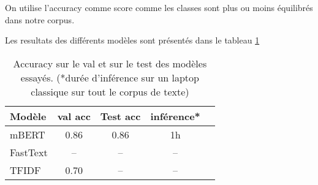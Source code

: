 
On utilise l'accuracy comme score comme les classes sont plus ou moins équilibrés dans notre corpus.

Les resultats des différents modèles sont présentés dans le tableau \ref{tab:results}

\begin{table}[ht]
    \centering
    \begin{tabular}{lcccc}
        \toprule
        Modèle & val acc & Test acc  & inférence* \\
        \midrule
        mBERT & 0.86 & 0.86 & 1h \\
        FastText & -- & -- & -- \\
        TFIDF & 0.70 & -- & -- \\
        \bottomrule
    \end{tabular}

    \caption{Accuracy sur le val et sur le test des modèles essayés. (*durée d'inférence sur un laptop classique sur tout le corpus de texte)}
    
    \label{tab:results}
\end{table}